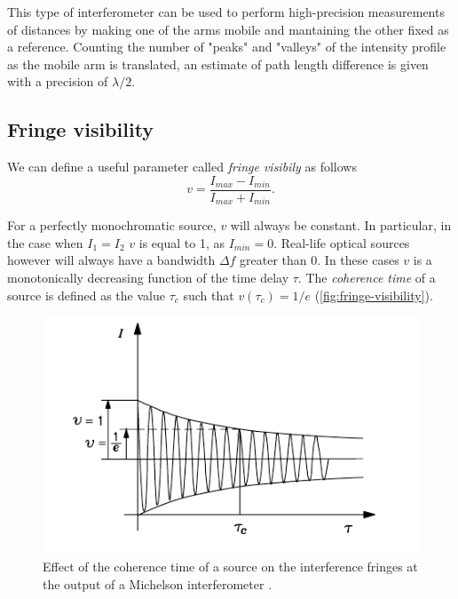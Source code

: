 This type of interferometer can be used to perform high-precision measurements of distances by making one of the arms mobile and mantaining the other fixed as a reference. Counting the number of "peaks" and "valleys" of the intensity profile as the mobile arm is translated, an estimate of path length difference is given with a precision of $\lambda/2$. \\


\subsection{Fringe visibility}

\noindent We can define a useful parameter called \emph{fringe visibily} as follows
\begin{equation}
\label{eq:fringevisibily}
v = \frac{I_{max} - I_{min}}{I_{max} + I_{min}}.
\end{equation}


For a perfectly monochromatic source, $v$ will always be constant. In particular, in the case when $I_1 = I_2$  $v$ is equal to 1, as $I_{min} = 0$. Real-life optical sources however will always have a bandwidth $\Delta f$ greater than 0. In these cases $v$ is a monotonically decreasing function of the time delay $\tau$.  The \emph{coherence time} of a source is defined as the value $\tau_c$ such that $v(\tau_c) = 1/e$ (\autoref{fig:fringe-visibility}). 




\begin{figure}[hbt]
	\myfloatalign
	\includegraphics[width=0.8\linewidth]{gfx/fringe-visibility}
	\caption{Effect of the coherence time of a source on the interference fringes at the output of a Michelson interferometer \cite{Someda2006}.}\label{fig:fringe-visibility}
\end{figure}


